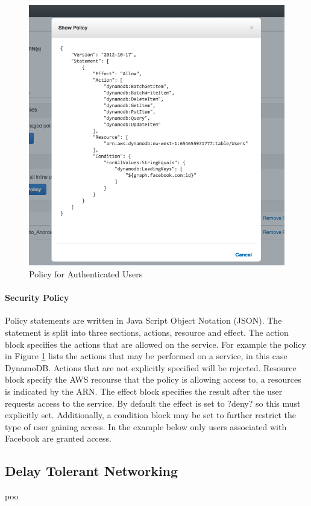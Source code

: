 \documentclass[a4paper, 11pt]{article}
\begin{document}
\begin{figure}[t]
\centering
\includegraphics[width=\textwidth]{iam_policy.png}
\caption{Policy for Authenticated Users}\label{fig:iam}
\end{figure}
\paragraph{Security Policy}Policy statements are written in Java Script Object Notation (JSON). The statement is split into three sections, actions, resource and effect. The action block specifies the actions that are allowed on the service. For example the policy in Figure \ref{fig:iam} lists the actions that may be performed on a service, in this case DynamoDB. Actions that are not explicitly specified will be rejected. Resource block specify the AWS recourse that the policy is allowing access to, a resources is indicated by the ARN. The effect block specifies the result after the user requests access to the service. By default the effect is set to ?deny? so this must explicitly set. Additionally, a condition block may be set to further restrict the type of user gaining access. In the example below only users associated with Facebook are granted access.


\subsection{Delay Tolerant Networking}
poo 
\end{document}

